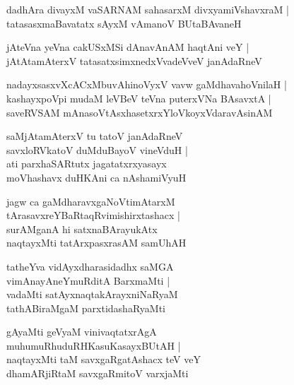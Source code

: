 \begin{shloka}
dadhAra divayxM vaSARNAM sahasarxM divxyamiVshavxraM |\\
tatasasxmaBavatatx sAyxM vAmanoV BUtaBAvaneH 
\end{shloka}

\begin{shloka}
jAteVna yeVna cakUSxMSi dAnavAnAM haqtAni veY |\\
jAtAtamAterxV tatasatxsimxnedxVvadeVveV janAdaRneV
\end{shloka}

\begin{shloka}
nadayxsasxvXcACxMbuvAhinoVyxV vavw gaMdhavahoVnilaH |\\
kashayxpoVpi mudaM leVBeV teVna puterxVNa BAsavxtA |\\
saveRVSAM mAnasoVtAsxhasetxrxYloVkoyxVdaravAsinAM
\end{shloka}

\begin{shloka}
saMjAtamAterxV tu tatoV janAdaRneV\\
savxloRVkatoV duMduBayoV vineVduH |\\
ati parxhaSARtutx jagatatxrxyasayx\\
moVhashavx duHKAni ca nAshamiVyuH
\end{shloka}

\begin{shloka}
jagw ca gaMdharavxgaNoVtimAtarxM\\
tArasavxreYBaRtaqRvimishirxtashacx |\\
surAMganA hi satxnaBArayukAtx\\
naqtayxMti tatArxpasxrasAM samUhAH
\end{shloka}

\begin{shloka}
tatheYva vidAyxdharasidadhx saMGA\\
vimAnayAneYmuRditA BarxmaMti |\\
vadaMti satAyxnaqtakArayxniNaRyaM \\
tathABiraMgaM parxtidashaRyaMti
\end{shloka}

\begin{shloka}
gAyaMti geVyaM vinivaqtatxrAgA\\
muhumuRhuduRHKasuKasayxBUtAH |\\
naqtayxMti taM savxgaRgatAshacx teV veY\\
dhamARjiRtaM savxgaRmitoV varxjaMti
\end{shloka}

